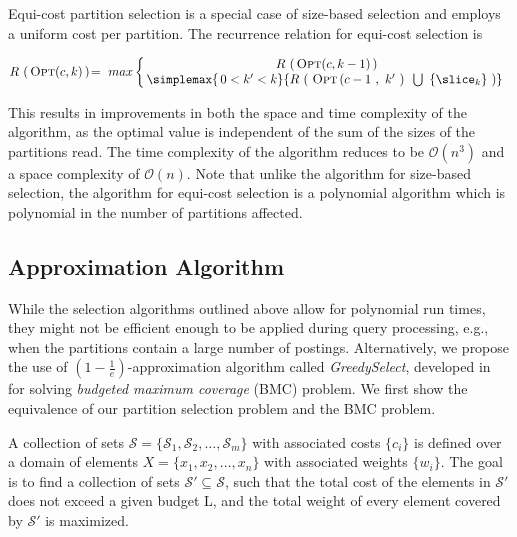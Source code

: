 Equi-cost partition selection is a special case of size-based selection and employs a uniform cost per partition. The recurrence relation for equi-cost selection is 

\begin{equation*}
R\,\left(\,\textsc{Opt}(c,k)\,\right) \!=\! \,\,\, max
\left\{\begin{array}{c@{\,\,\,}c}
 R\, \left(\,\textsc{Opt}(c,k-1)\,\right)\\
 \!\!\simplemax{\,0 < k' < k}{  R\,\left(\,\,\textsc{Opt}\left(c-1\,\,,\,\,k'\,\,\right)\,\,
  \, \bigcup \,\,\,\{\slice_{k}\} \,\,\right)} 
 \end{array}\right.
\end{equation*}
 
 This results in improvements in both the space and time complexity of the algorithm, as the optimal value is independent of the sum of the sizes of the partitions read. The time complexity of the algorithm
reduces to be $\mathcal{O}(n^3)$ and a space complexity of
$\mathcal{O}(n)$. Note that unlike the algorithm for size-based selection, the algorithm for equi-cost selection is a polynomial algorithm which is polynomial in the number of partitions affected.  

\subsection{Approximation Algorithm}
\label{sec:approx}
While the selection algorithms outlined above allow for polynomial run
times, they might not be efficient enough to be applied during query
processing, e.g., when the partitions contain a large number of postings. Alternatively, we propose the use of
$(1-\frac{1}{e})$-approximation algorithm called
\emph{Greedy\-Select}, developed in~\cite{budgetedmaxcover} for solving
\emph{budgeted maximum coverage} (BMC) problem. We first show
the equivalence of our partition selection problem and the BMC
problem.

\begin{definition} A collection of sets $\mathcal{S} = \{ \mathcal{S}_1 , \mathcal{S}_2, \ldots , \mathcal{S}_m\}$ with associated costs $\{ c_i \}$ is defined over a domain of elements $X= \{ x_1,x_2, \ldots,x_n\}$ with associated weights $\{ w_i \}$. The goal is to find a collection of sets $\mathcal{S}' \subseteq \mathcal{S}$, such that the total cost of the elements in $\mathcal{S}'$ does not exceed a given budget L, and the total weight of every element covered by $\mathcal{S}'$ is maximized.

\end{definition}

